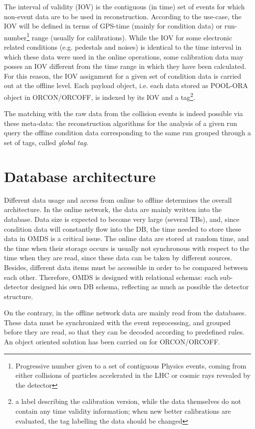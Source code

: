 \documentclass[a4paper]{jpconf}
\begin{document}
The interval of validity (IOV) is the contiguous (in time) set of events for which non-event data are to be used in reconstruction.
According to the use-case, the IOV will be defined in terms of GPS-time (mainly for condition data) or run-number\footnote{Progressive number given to a set of contiguous Physics events, coming from either collisions of particles accelerated in the LHC or cosmic rays revealed by the detector} range (usually for calibrations). 
While the IOV for some electronic related conditions (e.g. pedestals and noises) is identical to the time interval in which these data were used in the online operations, some calibration data may posses an IOV different from the time range in which they have been calculated.
For this reason, the IOV assignment for a given set of condition data is carried out at the offline level.
Each payload object, i.e. each data stored as POOL-ORA object in ORCON/ORCOFF, is indexed by its IOV and a  tag\footnote{a label describing the calibration version, while the data themselves do not contain any time validity information; when new better calibrations are evaluated, the tag labelling the data should be changed}.     

The matching with the raw data from the collision events is indeed possible via these meta-data: the reconstruction algorithms for the analysis of a given run query the offline condition data corresponding to the same run grouped through a set of tags, called \emph{global tag}.

\section{Database architecture}
Different data usage and access from online to offline determines the overall architecture.
In the online network, the data are mainly written into the database. 
Data size is expected to become very large (several TBs), and, since condition data will constantly flow into the DB, the time needed to store these data in OMDS is a critical issue. 
The online data are stored at random time, and the time when their storage occurs is usually not synchronous with respect to the time when they are read, since these data can be taken by different sources. 
Besides, different data items must be accessible in order to be compared between each other. 
Therefore, OMDS is designed with relational schemas: each sub-detector designed his own DB schema, reflecting as much as possible the detector structure.

On the contrary, in the offline network data are mainly read from the databases.  These data must be synchronized with the event reprocessing, and grouped before they are read, so that they can be decoded according to predefined rules. An object oriented solution has been carried on for ORCON/ORCOFF.
\end{document}
